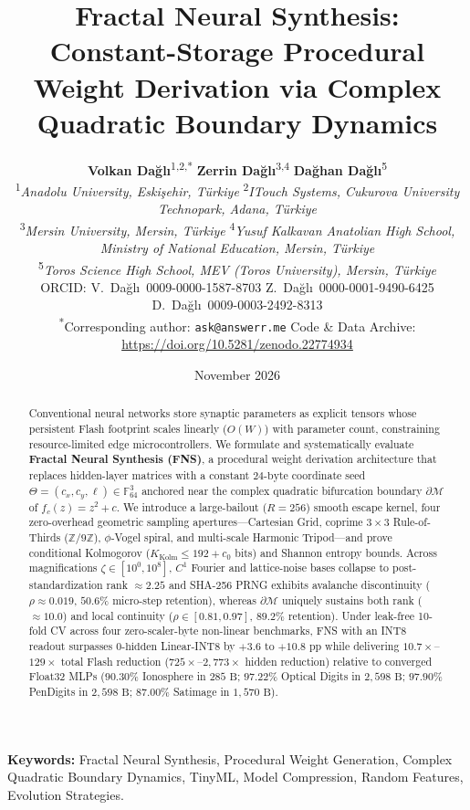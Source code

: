 \documentclass[10pt,twocolumn]{article}
\title{\textbf{\Large Fractal Neural Synthesis: Constant-Storage Procedural Weight Derivation via Complex Quadratic Boundary Dynamics}}
\author{
    \textbf{Volkan Da\u{g}l\i}\textsuperscript{1,2,*}\quad
    \textbf{Zerrin Da\u{g}l\i}\textsuperscript{3,4}\quad
    \textbf{Da\u{g}han Da\u{g}l\i}\textsuperscript{5} \\[5pt]
    \footnotesize\textsuperscript{1}\textit{Anadolu University, Eski\c{s}ehir, T\"{u}rkiye} \;\textbullet\;
    \textsuperscript{2}\textit{ITouch Systems, Cukurova University Technopark, Adana, T\"{u}rkiye} \\
    \footnotesize\textsuperscript{3}\textit{Mersin University, Mersin, T\"{u}rkiye} \;\textbullet\;
    \textsuperscript{4}\textit{Yusuf Kalkavan Anatolian High School, Ministry of National Education, Mersin, T\"{u}rkiye} \\
    \footnotesize\textsuperscript{5}\textit{Toros Science High School, MEV (Toros University), Mersin, T\"{u}rkiye} \\[3pt]
    \footnotesize ORCID: V.~Da\u{g}l\i\ 0009-0000-1587-8703 \;\textbullet\;
    Z.~Da\u{g}l\i\ 0000-0001-9490-6425 \;\textbullet\;
    D.~Da\u{g}l\i\ 0009-0003-2492-8313 \\
    \footnotesize\textsuperscript{*}Corresponding author: \texttt{ask@answerr.me} \;\textbullet\;
    Code \& Data Archive: \url{https://doi.org/10.5281/zenodo.22774934}
}
\date{November 2026}
\begin{document}
\maketitle

\begin{abstract}
Conventional neural networks store synaptic parameters as explicit tensors whose persistent Flash footprint scales linearly ($O(W)$) with parameter count, constraining resource-limited edge microcontrollers. We formulate and systematically evaluate \textbf{Fractal Neural Synthesis (FNS)}, a procedural weight derivation architecture that replaces hidden-layer matrices with a constant $24\text{-byte}$ coordinate seed $\Theta = (c_x, c_y, \ell) \in \mathbb{F}_{64}^3$ anchored near the complex quadratic bifurcation boundary $\partial\mathcal{M}$ of $f_c(z)=z^2+c$. We introduce a large-bailout ($R=256$) smooth escape kernel, four zero-overhead geometric sampling apertures---Cartesian Grid, coprime $3\times 3$ Rule-of-Thirds ($\mathbb{Z}/9\mathbb{Z}$), $\phi$-Vogel spiral, and multi-scale Harmonic Tripod---and prove conditional Kolmogorov ($K_{\mathrm{Kolm}} \le 192+c_0$ bits) and Shannon entropy bounds. Across magnifications $\zeta\in[10^0,10^8]$, $C^1$ Fourier and lattice-noise bases collapse to post-standardization rank $\approx 2.25$ and SHA-256 PRNG exhibits avalanche discontinuity ($\rho\approx 0.019$, $50.6\%$ micro-step retention), whereas $\partial\mathcal{M}$ uniquely sustains both rank ($\approx 10.0$) and local continuity ($\rho\in[0.81,0.97]$, $89.2\%$ retention). Under leak-free 10-fold CV across four zero-scaler-byte non-linear benchmarks, FNS with an INT8 readout surpasses $0\text{-hidden}$ Linear-INT8 by $+3.6$ to $+10.8$ pp while delivering $10.7\times$--$129\times$ total Flash reduction ($725\times$--$2{,}773\times$ hidden reduction) relative to converged Float32 MLPs ($90.30\%$ Ionosphere in $285\text{ B}$; $97.22\%$ Optical Digits in $2{,}598\text{ B}$; $97.90\%$ PenDigits in $2{,}598\text{ B}$; $87.00\%$ Satimage in $1{,}570\text{ B}$).
\end{abstract}

\vspace{0.15cm}
\noindent\textbf{Keywords:} Fractal Neural Synthesis, Procedural Weight Generation, Complex Quadratic Boundary Dynamics, TinyML, Model Compression, Random Features, Evolution Strategies.





\end{document}
